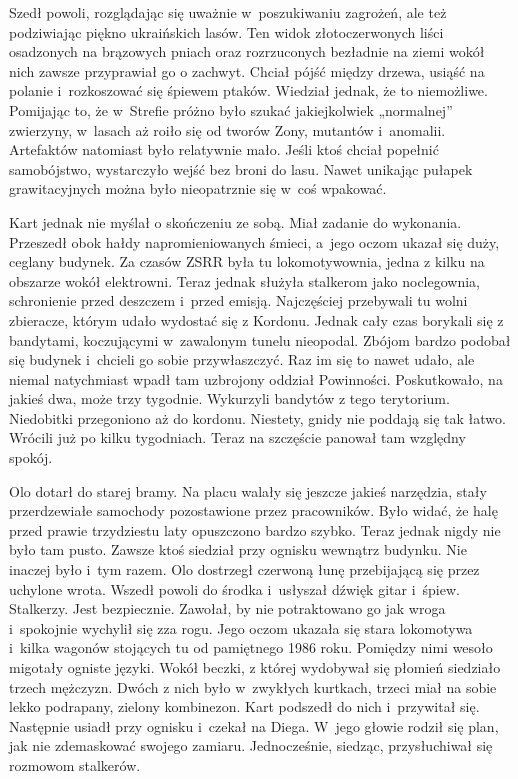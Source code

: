 \documentclass[../MAIN.tex]{subfiles}
\begin{document}
Szedł powoli, rozglądając się uważnie w~poszukiwaniu zagrożeń, ale też podziwiając piękno ukraińskich lasów. Ten widok złotoczerwonych liści osadzonych na brązowych pniach oraz rozrzuconych bezładnie na ziemi wokół nich zawsze przyprawiał go o zachwyt. Chciał pójść między drzewa, usiąść na polanie i~rozkoszować się śpiewem ptaków. Wiedział jednak, że to niemożliwe. Pomijając to, że w~Strefie próżno było szukać jakiejkolwiek „normalnej” zwierzyny, w~lasach aż roiło się od tworów Zony, mutantów i~anomalii. Artefaktów natomiast było relatywnie mało. Jeśli ktoś chciał popełnić samobójstwo, wystarczyło wejść bez broni do lasu. Nawet unikając pułapek grawitacyjnych można było nieopatrznie się w~coś wpakować.

Kart jednak nie myślał o skończeniu ze sobą. Miał zadanie do wykonania. Przeszedł obok hałdy napromieniowanych śmieci, a~jego oczom ukazał się duży, ceglany budynek. Za czasów ZSRR była tu lokomotywownia, jedna z kilku na obszarze wokół elektrowni. Teraz jednak służyła stalkerom jako noclegownia, schronienie przed deszczem i~przed emisją. Najczęściej przebywali tu wolni zbieracze, którym udało wydostać się z Kordonu. Jednak cały czas borykali się z bandytami, koczującymi w~zawalonym tunelu nieopodal. Zbójom bardzo podobał się budynek i~chcieli go sobie przywłaszczyć. Raz im się to nawet udało, ale niemal natychmiast wpadł tam uzbrojony oddział Powinności. Poskutkowało, na jakieś dwa, może trzy tygodnie. Wykurzyli bandytów z tego terytorium. Niedobitki przegoniono aż do kordonu. Niestety, gnidy nie poddają się tak łatwo. Wrócili już po kilku tygodniach. Teraz na szczęście panował tam względny spokój.

Olo dotarł do starej bramy. Na placu walały się jeszcze jakieś narzędzia, stały przerdzewiałe samochody pozostawione przez pracowników. Było widać, że halę przed prawie trzydziestu laty opuszczono bardzo szybko. Teraz jednak nigdy nie było tam pusto. Zawsze ktoś siedział przy ognisku wewnątrz budynku. Nie inaczej było i~tym razem. Olo dostrzegł czerwoną łunę przebijającą się przez uchylone wrota. Wszedł powoli do środka i~usłyszał dźwięk gitar i~śpiew. Stalkerzy. Jest bezpiecznie. Zawołał, by nie potraktowano go jak wroga i~spokojnie wychylił się zza rogu. Jego oczom ukazała się stara lokomotywa i~kilka wagonów stojących tu od pamiętnego 1986 roku. Pomiędzy nimi wesoło migotały ogniste języki. Wokół beczki, z której wydobywał się płomień siedziało trzech mężczyzn. Dwóch z nich było w~zwykłych kurtkach, trzeci miał na sobie lekko podrapany, zielony kombinezon. Kart podszedł do nich i~przywitał się. Następnie usiadł przy ognisku i~czekał na Diega. W~jego głowie rodził się plan, jak nie zdemaskować swojego
zamiaru. Jednocześnie, siedząc, przysłuchiwał się rozmowom stalkerów.
\end{document}
